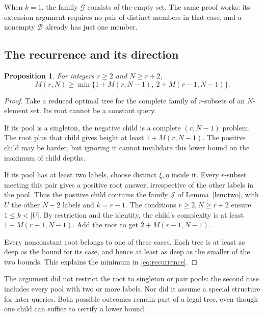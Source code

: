 \documentclass[11pt]{article}
\newtheorem{proposition}[theorem]{Proposition}
\theoremstyle{definition}
\theoremstyle{remark}
\numberwithin{equation}{section}
\begin{document}
When \(k=1\), the family \(\mathcal G\) consists of the empty set.
The same proof works: its extension argument requires no pair of
distinct members in that case, and a nonempty \(\mathcal B\)
already has just one member.

\subsection{The recurrence and its direction}

\begin{proposition}\label{prop:recurrence}
For integers \(r\ge2\) and \(N\ge r+2\),
\begin{equation}\label{eq:recurrence}
 \boxed{M(r,N)\ge
 \min\{1+M(r,N-1),\ 2+M(r-1,N-1)\}.}
\end{equation}
\end{proposition}
\begin{proof}
Take a reduced optimal tree for the complete family of \(r\)-subsets
of an \(N\)-element set. Its root cannot be a constant query.

If its pool is a singleton, the negative child is a complete
\((r,N-1)\) problem. The root plus that child gives height at least
\(1+M(r,N-1)\). The positive child may be harder, but ignoring it
cannot invalidate this lower bound on the maximum of child depths.

If its pool has at least two labels, choose distinct \(\xi,\eta\)
inside it. Every \(r\)-subset meeting this pair gives a positive
root answer, irrespective of the other labels in the pool.
Thus the positive child contains the family \(\mathcal J\) of
Lemma~\ref{lem:two}, with \(U\) the other \(N-2\) labels and
\(k=r-1\). The conditions \(r\ge2,N\ge r+2\) ensure
\(1\le k<|U|\).
By restriction and the identity, the child's complexity is at least
\(1+M(r-1,N-1)\). Add the root to get
\(2+M(r-1,N-1)\).

Every nonconstant root belongs to one of these cases. Each tree is
at least as deep as the bound for its case, and hence at least as
deep as the smaller of the two bounds. This explains the minimum
in \eqref{eq:recurrence}.
\end{proof}

The argument did not restrict the root to singleton or pair pools:
the second case includes every pool with two or more labels.
Nor did it assume a special structure for later queries.
Both possible outcomes remain part of a legal tree, even though
one child can suffice to certify a lower bound.
\end{document}
